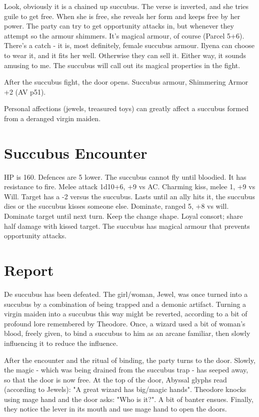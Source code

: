 Look, obviously it is a chained up succubus. The verse is inverted, and she tries guile to get free. When she is free, she reveals her form and keeps free by her power. The party can try to get opportunity attacks in, but whenever they attempt so the armour shimmers. It's magical armour, of course (Parcel 5+6). There's a catch - it is, most definitely, female succubus armour. Ilyena can choose to wear it, and it fits her well. Otherwise they can sell it. Either way, it sounds amusing to me. The succubus will call out its magical properties in the fight. 

After the succubus fight, the door opens. Succubus armour, Shimmering Armor +2 (AV p51).

Personal affections (jewels, treasured toys) can greatly affect a succubus formed from a deranged virgin maiden.

\section{Succubus Encounter}
HP is 160. Defences are 5 lower. The succubus cannot fly until bloodied. It has resistance to fire. Melee attack 1d10+6, +9 vs AC. Charming kiss, melee 1, +9 vs Will. Target has a -2 versus the succubus. Lasts until an ally hits it, the succubus dies or the succubus kisses someone else. Dominate, ranged 5, +8 vs will. Dominate target until next turn. Keep the change shape. Loyal consort; share half damage with kissed target. The succubus has magical armour that prevents opportunity attacks.

\section{Report}
De succubus has been defeated. The girl/woman, Jewel, was once turned into a succubus by a combination of being trapped and a demonic artifact. Turning a virgin maiden into a succubus this way might be reverted, according to a bit of profound lore remembered by Theodore. Once, a wizard used a bit of woman's blood, freely given, to bind a succubus to him as an arcane familiar, then slowly influencing it to reduce the influence.

After the encounter and the ritual of binding, the party turns to the door. Slowly, the magic - which was being drained from the succubus trap - has seeped away, so that the door is now free. At the top of the door, Abyssal glyphs read (according to Jewels): "A great wizard has big/magic hands". Theodore knocks using mage hand and the door asks: "Who is it?". A bit of banter ensues. Finally, they notice the lever in its mouth and use mage hand to open the doors.

